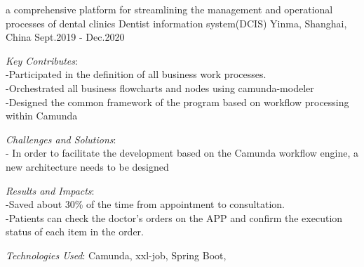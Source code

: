 \begin{cventries}
{\begin{cvitems}
      \end{cvitems}
    }
  \cventry
    {a comprehensive platform for streamlining the management and operational processes of dental clinics} %
    {Dentist information system({DCIS})} %
    {Yinma, Shanghai, China} %
    {Sept.2019 - Dec.2020} %
    {
      \begin{cvitems} %
        \item {\textit{Key Contributes}:  \\-Participated in the definition of all business work processes. \\-Orchestrated all business flowcharts and nodes using camunda-modeler \\-Designed the common framework of the program based on workflow processing within Camunda}
        \item {\textit{Challenges and Solutions}: \\- In order to facilitate the development based on the Camunda workflow engine, a new architecture needs to be designed}
        \item {\textit{Results and Impacts}: \\-Saved about 30\% of the time from appointment to  consultation. \\-Patients can check the doctor's orders on the APP and confirm the execution status of each item in the order.}
        \item {\textit{Technologies Used}: Camunda, xxl-job, Spring Boot, }
      \end{cvitems}
    }




\end{cventries}
